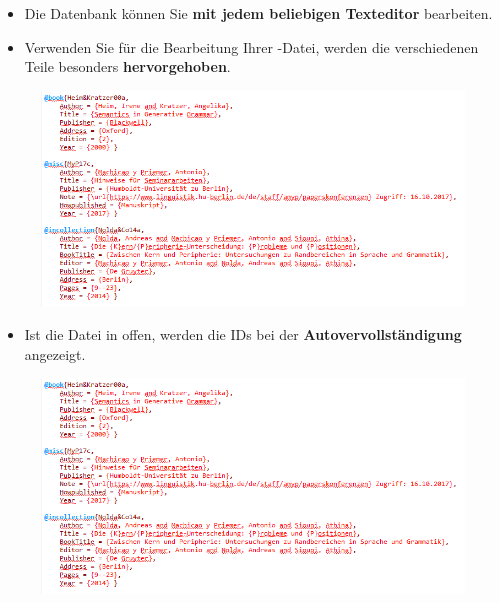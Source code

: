 \begin{frame}[fragile]

\begin{itemize}
	\item Die Datenbank können Sie \textbf{mit jedem beliebigen Texteditor} bearbeiten. 
	
	\item Verwenden Sie  für die Bearbeitung Ihrer -Datei, werden die verschiedenen Teile besonders \textbf{hervorgehoben}.
	

\end{itemize}

\begin{figure}
	\centering
	\includegraphics[width=.90\textwidth]{../../texfiles-beamer/tex-material/WissArb-latex/bibeintraege}
\end{figure}

\nocite{Heim&Kratzer00a}
\nocite{MyP17c}
\nocite{Nolda&Co14a}

\end{frame}


\begin{frame}[fragile]

\begin{itemize}

	\item Ist die Datei in  offen, werden die IDs bei der \textbf{Autovervollständigung} angezeigt.
\end{itemize}

\begin{figure}
	\centering
	\includegraphics[width=.90\textwidth]{../../texfiles-beamer/tex-material/WissArb-latex/bibeintraege}
\end{figure}

\end{frame}


